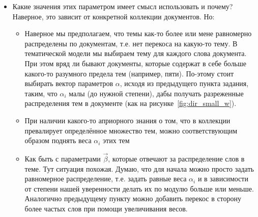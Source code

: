 \begin{solution}
\begin{itemize}
	\item Какие значения этих параметром имеет смысл использовать и почему? Наверное, это зависит от конкретной коллекции документов. Но:
	\begin{itemize}
		\item Наверное мы предполагаем, что темы как-то более или мене равномерно распределены по документам, т.е. нет перекоса на какую-то тему. В тематической модели мы выбираем тему для каждого слова документа. При этом вряд ли бывают документы, которые содержат в себе больше какого-то разумного предела тем (например, пяти). По-этому стоит выбирать вектор параметров $\alpha$, исходя из предыдущего пункта задания, таким, что $\alpha_i$ малы (до нужной степени), дабы получать разреженные распределения тем в документе (как на рисунке~\ref{fig:dir_small_w}).
		\item При наличии какого-то априорного знания о том, что в коллекции превалирует определённое множество тем, можно соответствующим образом поднять веса $\alpha_i$ этих тем
		\item Как быть с параметрами $\vec{\beta}$, которые отвечают за распределение слов в теме. Тут ситуация похожая. Думаю, что для начала можно просто задать равномерное распределение, т.е. задать равные веса $\alpha_i$ и в зависимости от степени нашей уверенности делать их по модулю больше или меньше. Аналогично предыдущему пункту можно добавить перекос в сторону более частых слов при помощи увеличивания весов.
	\end{itemize}
\end{itemize}
\end{solution}

